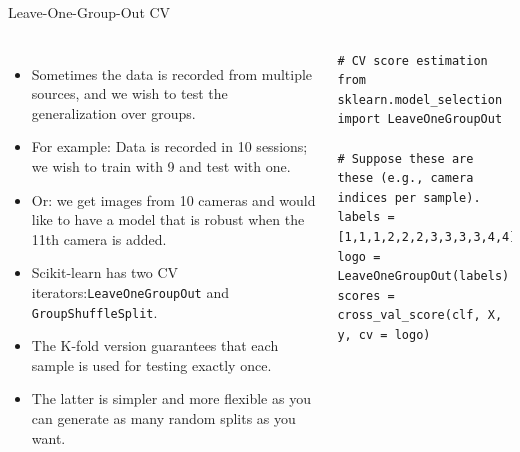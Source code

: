 \documentclass[10pt, aspectratio=169]{beamer} %
\begin{document}
\begin{frame}[fragile]{Leave-One-Group-Out CV}
\begin{columns}
{\small\vspace*{-0.8cm}
\begin{itemize}
\item Sometimes the data is recorded from multiple sources, and we wish
to test the generalization over groups.
\item For example: Data is recorded in 10 sessions; we wish to train with 9 and test with one.
\item Or: we get images from 10 cameras and would like to have a model that is robust when the 11th
camera is added.
\item Scikit-learn has two CV iterators:\verb+LeaveOneGroupOut+ and \verb+GroupShuffleSplit+. 
\item The K-fold version guarantees that each sample is used for testing exactly once. 
\item The latter is simpler and more flexible as you can generate as many random splits as you want.
\end{itemize}
}
\begin{lstlisting}
# CV score estimation
from sklearn.model_selection import LeaveOneGroupOut

# Suppose these are these (e.g., camera indices per sample).
labels = [1,1,1,2,2,2,3,3,3,3,4,4] 
logo = LeaveOneGroupOut(labels)
scores = cross_val_score(clf, X, y, cv = logo)
\end{lstlisting}
\end{columns}
\end{frame}
\end{document}
